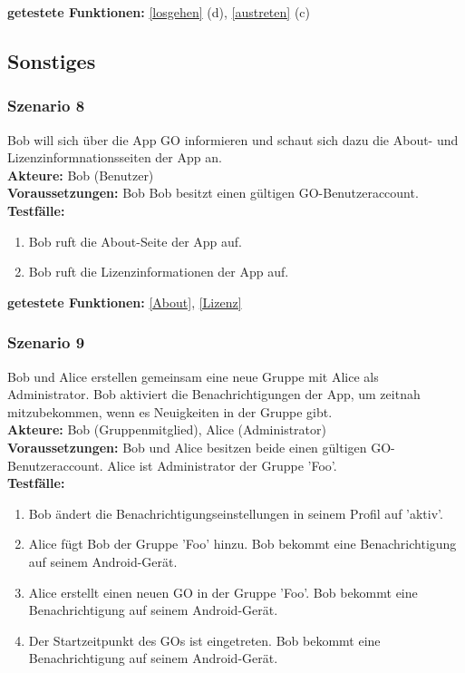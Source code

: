 \documentclass[parskip=full]{scrartcl}
\def\threedigits#1{%
  \ifnum#1<100 0\fi
  \ifnum#1<10 0\fi
  \number#1}
\begin{document}
\textbf{getestete Funktionen: }\ref{losgehen} (d), \ref{austreten} (c)

\subsection{Sonstiges}

\subsubsection*{Szenario 8} Bob will sich über die App GO informieren und schaut sich dazu die About- und Lizenzinformnationsseiten der App an.\\

\textbf{Akteure: }Bob (Benutzer)\\

\textbf{Voraussetzungen: }Bob Bob besitzt einen gültigen GO-Benutzeraccount.\\

\textbf{Testfälle:}
\begin{enumerate}[label={\textbf{/T\protect\threedigits{\theenumi}0/}}, leftmargin=*, resume]
	\item Bob ruft die About-Seite der App auf.
	\item Bob ruft die Lizenzinformationen der App auf.
\end{enumerate}

\textbf{getestete Funktionen: }\ref{About}, \ref{Lizenz}

\subsubsection*{Szenario 9} Bob und Alice erstellen gemeinsam eine neue Gruppe mit Alice als Administrator. Bob aktiviert die Benachrichtigungen der App, um zeitnah mitzubekommen, wenn es Neuigkeiten in der Gruppe gibt.\\

\textbf{Akteure: }Bob (Gruppenmitglied), Alice (Administrator)\\

\textbf{Voraussetzungen: }Bob und Alice besitzen beide einen gültigen GO-Benutzeraccount. Alice ist Administrator der Gruppe 'Foo'.\\

\textbf{Testfälle:}
\begin{enumerate}[label={\textbf{/T\protect\threedigits{\theenumi}0/}}, leftmargin=*, resume]
	\item Bob ändert die Benachrichtigungseinstellungen in seinem Profil auf 'aktiv'.
	\item Alice fügt Bob der Gruppe 'Foo' hinzu. Bob bekommt eine Benachrichtigung auf seinem Android-Gerät.
	\item Alice erstellt einen neuen GO in der Gruppe 'Foo'. Bob bekommt eine Benachrichtigung auf seinem Android-Gerät.
	\item Der Startzeitpunkt des GOs ist eingetreten. Bob bekommt eine Benachrichtigung auf seinem Android-Gerät.
\end{enumerate}
\end{document}
